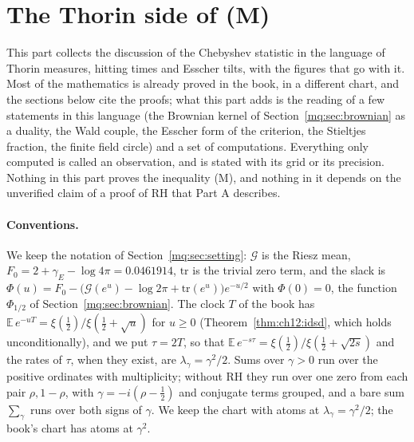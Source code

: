 \section{The Thorin side of (M)}\label{mqt:sec:main}

This part collects the discussion of the Chebyshev statistic in the language of Thorin measures, hitting times and Esscher tilts, with the figures that go with it. Most of the mathematics is already proved in the book, in a different chart, and the sections below cite the proofs; what this part adds is the reading of a few statements in this language (the Brownian kernel of Section~\ref{mq:sec:brownian} as a duality, the Wald couple, the Esscher form of the criterion, the Stieltjes fraction, the finite field circle) and a set of computations. Everything only computed is called an observation, and is stated with its grid or its precision. Nothing in this part proves the inequality (M), and nothing in it depends on the unverified claim of a proof of RH that Part A describes.

\paragraph{Conventions.} We keep the notation of Section~\ref{mq:sec:setting}: $\mathcal G$ is the Riesz mean, $F_0=2+\gamma_E-\log4\pi=0.0461914$, $\mathrm{tr}$ is the trivial zero term, and the slack is $\Phi(u)=F_0-\big(\mathcal G(e^u)-\log2\pi+\mathrm{tr}(e^u)\big)e^{-u/2}$ with $\Phi(0)=0$, the function $\Phi_{1/2}$ of Section~\ref{mq:sec:brownian}. The clock $T$ of the book has $\mathbb E\,e^{-uT}=\xi(\frac12)/\xi(\frac12+\sqrt u)$ for $u\ge0$ (Theorem~\ref{thm:ch12:idsd}, which holds unconditionally), and we put $\tau=2T$, so that $\mathbb E\,e^{-s\tau}=\xi(\frac12)/\xi(\frac12+\sqrt{2s})$ and the rates of $\tau$, when they exist, are $\lambda_\gamma=\gamma^2/2$. Sums over $\gamma>0$ run over the positive ordinates with multiplicity; without RH they run over one zero from each pair $\rho,1-\rho$, with $\gamma=-i(\rho-\frac12)$ and conjugate terms grouped, and a bare sum $\sum_\gamma$ runs over both signs of $\gamma$. We keep the chart with atoms at $\lambda_\gamma=\gamma^2/2$; the book's chart has atoms at $\gamma^2$.

